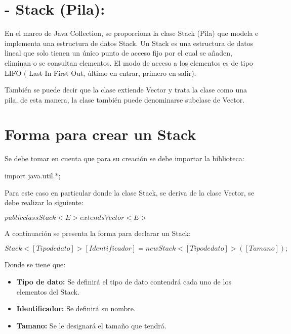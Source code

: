 \documentclass[12pt, letterpaper]{article} %
\begin{document}
\section*{- Stack (Pila):}
En el marco de Java Collection, se proporciona la clase Stack (Pila) que modela e implementa una estructura de datos Stack. Un Stack es una estructura de datos lineal que solo tienen un único punto de acceso fijo por el cual se añaden, eliminan o se consultan elementos. El modo de acceso a los elementos es de tipo LIFO ( Last In First Out, último en entrar, primero en salir).

También se puede decir que la clase extiende Vector y trata la clase como una pila, de esta manera, la clase también puede denominarse subclase de Vector.
\section*{Forma para crear un Stack}
Se debe tomar en cuenta que para su creación se debe importar la biblioteca:

\begin{center}
    import java.util.*;
\end{center}

Para este caso en particular donde la clase Stack, se deriva de la clase Vector, se debe realizar lo siguiente:
\begin{center}
    $public class Stack<E> extends Vector<E>$
\end{center}
A continuación se presenta la forma para declarar un Stack:
\begin{center}
    $Stack<[Tipo de dato]> [Identificador] = new Stack<[Tipo de dato]>([Tamano]);$
\end{center}
Donde se tiene que:
\begin{itemize}
    \item \textbf{Tipo de dato:} Se definirá el tipo de dato contendrá cada uno de los elementos del Stack.
    \item \textbf{Identificador:} Se definirá su nombre.
    \item \textbf{Tamano:} Se le designará el tamaño que tendrá.
\end{itemize}
\end{document}
